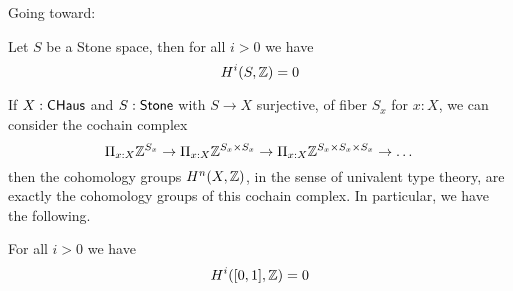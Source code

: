 Going toward:

\begin{theorem}
Let $S$ be a Stone space, then for all $i>0$ we have \[H^i(S,\mathbb{Z}) = 0\]
\end{theorem}

If $X:\mathsf{CHaus}$ and $S:\mathsf{Stone}$ with $S\rightarrow X$ surjective, of fiber $S_x$ for $x:X$,  we can consider the cochain complex
\[\Pi_{x:X}\mathbb{Z}^{S_x}\rightarrow \Pi_{x:X}\mathbb{Z}^{S_x\times S_x}\rightarrow \Pi_{x:X}\mathbb{Z}^{S_x\times S_x\times S_x}\rightarrow\dots\]
then the cohomology groups $H^n(X,\mathbb{Z})$, in the sense of univalent type theory, are exactly the cohomology groups of this
cochain complex. In particular, we have the following.

\begin{proposition}
For all $i>0$ we have \[H^i([0,1],\mathbb{Z}) = 0\]
\end{proposition}





